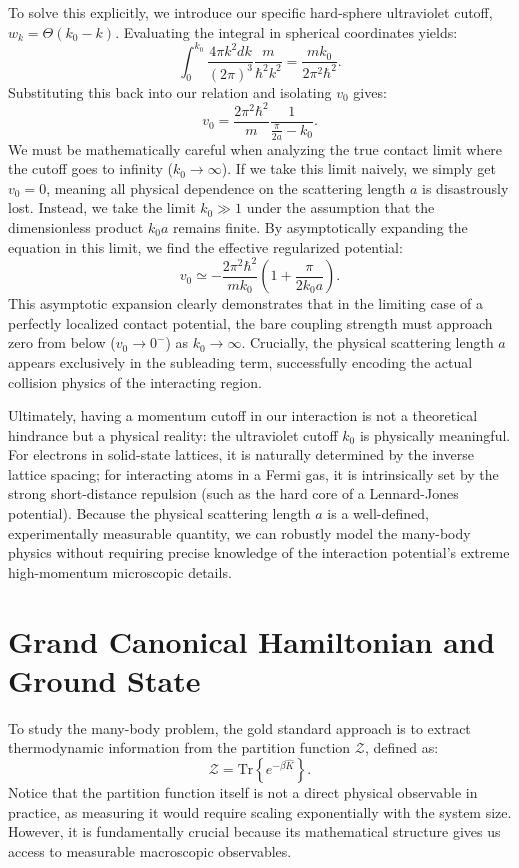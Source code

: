 To solve this explicitly, we introduce our specific hard-sphere ultraviolet cutoff, \( w_k = \Theta(k_0 - k) \). Evaluating the integral in spherical coordinates yields:
\[
    \int_0^{k_0} \frac{4\pi k^2 dk}{(2\pi)^3} \frac{m}{\hbar^2 k^2} = \frac{m k_0}{2\pi^2 \hbar^2}.
\]
Substituting this back into our relation and isolating \( v_0 \) gives:
\[
    v_0 = \frac{2\pi^2 \hbar^2}{m} \frac{1}{\frac{\pi}{2 a} - k_0}.
\]
We must be mathematically careful when analyzing the true contact limit where the cutoff goes to infinity (\( k_0 \to \infty \)). If we take this limit naively, we simply get \( v_0 = 0 \), meaning all physical dependence on the scattering length \( a \) is disastrously lost. Instead, we take the limit \( k_0 \gg 1 \) under the assumption that the dimensionless product \( k_0 a \) remains finite. By asymptotically expanding the equation in this limit, we find the effective regularized potential:
\[
    v_0 \simeq -\frac{2\pi^2\hbar^2}{m k_0} \left( 1 + \frac{\pi}{2k_0 a} \right).
\]
This asymptotic expansion clearly demonstrates that in the limiting case of a perfectly localized contact potential, the bare coupling strength must approach zero from below (\( v_0 \to 0^- \)) as \( k_0 \to \infty \). Crucially, the physical scattering length \( a \) appears exclusively in the subleading term, successfully encoding the actual collision physics of the interacting region.

Ultimately, having a momentum cutoff in our interaction is not a theoretical hindrance but a physical reality: the ultraviolet cutoff \( k_0 \) is physically meaningful. For electrons in solid-state lattices, it is naturally determined by the inverse lattice spacing; for interacting atoms in a Fermi gas, it is intrinsically set by the strong short-distance repulsion (such as the hard core of a Lennard-Jones potential). Because the physical scattering length \( a \) is a well-defined, experimentally measurable quantity, we can robustly model the many-body physics without requiring precise knowledge of the interaction potential's extreme high-momentum microscopic details.

\section{Grand Canonical Hamiltonian and Ground State}

To study the many-body problem, the gold standard approach is to extract thermodynamic information from the partition function \( \mathcal{Z} \), defined as:
\[
    \mathcal{Z} = \text{Tr}\left\{e^{-\beta \hat{K}}\right\}.
\]
Notice that the partition function itself is not a direct physical observable in practice, as measuring it would require scaling exponentially with the system size. However, it is fundamentally crucial because its mathematical structure gives us access to measurable macroscopic observables.

